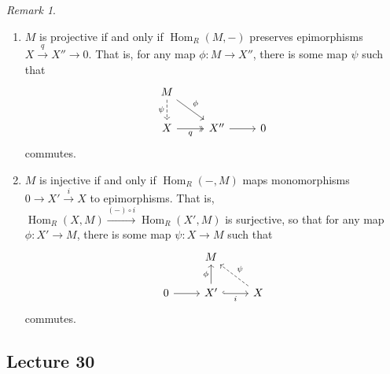 \documentclass[10pt,letterpaper,cm]{nupset}
\theoremstyle{definition}
\theoremstyle{theorem}
\theoremstyle{remark}
\newtheorem{remark}[definition]{Remark}
\newcommand{\1}{\mathbf{1}}
\newcommand{\0}{\vec 0}
\DeclareMathOperator{\Hom}{Hom}
\begin{document}
\begin{remark} $ $
\begin{enumerate}
\item $M$ is projective  if and only if $\Hom_R(M, -)$ preserves epimorphisms $X \overset{q}{\longrightarrow}  X'' \to 0$. That is, for any map $\phi : M \to X''$, there is some map $\psi$ such that
\[
\begin{tikzcd}
M \arrow[rd, "\phi"] \arrow[d, "\psi"', dashed] &  &  \\
X \arrow[r, "q"', two heads] & X'' \arrow[r] & 0
\end{tikzcd}
\] commutes.
\item $M$ is injective  if and only if $\Hom_R(-, M)$ maps monomorphisms $0\to X' \overset{i}{\longrightarrow} X$ to epimorphisms. That is, $\Hom_R(X, M) \overset{(-) \circ i}{\longrightarrow} \Hom_R(X', M)$ is surjective, so that for any map $\phi : X' \to M$, there is some map $\psi : X \to M$ such that 
\[
\begin{tikzcd}
 & M &  \\
0 \arrow[r] & X' \arrow[r, "i"', hook] \arrow[u, "\phi"] & X \arrow[lu, "\psi"', dashed]
\end{tikzcd}
\] commutes.
\end{enumerate}
\end{remark}

\subsection{Lecture 30}
\end{document}
